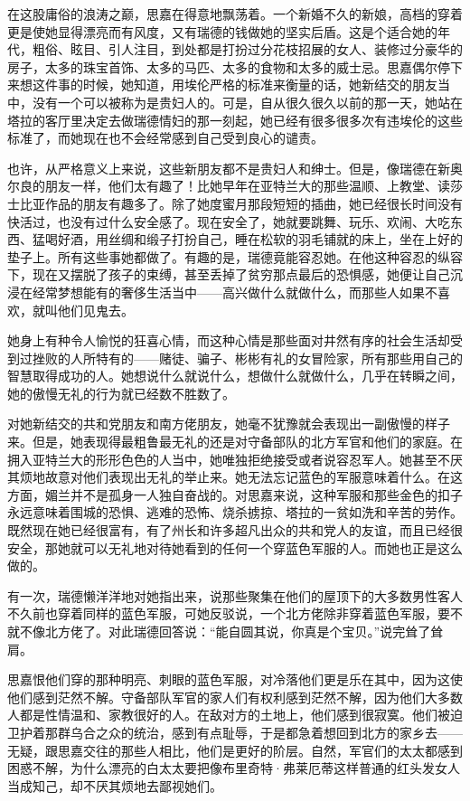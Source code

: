 \par 在这股庸俗的浪涛之巅，思嘉在得意地飘荡着。一个新婚不久的新娘，高档的穿着更是使她显得漂亮而有风度，又有瑞德的钱做她的坚实后盾。这是个适合她的年代，粗俗、眩目、引人注目，到处都是打扮过分花枝招展的女人、装修过分豪华的房子，太多的珠宝首饰、太多的马匹、太多的食物和太多的威士忌。思嘉偶尔停下来想这件事的时候，她知道，用埃伦严格的标准来衡量的话，她新结交的朋友当中，没有一个可以被称为是贵妇人的。可是，自从很久很久以前的那一天，她站在塔拉的客厅里决定去做瑞德情妇的那一刻起，她已经有很多很多次有违埃伦的这些标准了，而她现在也不会经常感到自己受到良心的谴责。
\par 也许，从严格意义上来说，这些新朋友都不是贵妇人和绅士。但是，像瑞德在新奥尔良的朋友一样，他们太有趣了！比她早年在亚特兰大的那些温顺、上教堂、读莎士比亚作品的朋友有趣多了。除了她度蜜月那段短短的插曲，她已经很长时间没有快活过，也没有过什么安全感了。现在安全了，她就要跳舞、玩乐、欢闹、大吃东西、猛喝好酒，用丝绸和缎子打扮自己，睡在松软的羽毛铺就的床上，坐在上好的垫子上。所有这些事她都做了。有趣的是，瑞德竟能容忍她。在他这种容忍的纵容下，现在又摆脱了孩子的束缚，甚至丢掉了贫穷那点最后的恐惧感，她便让自己沉浸在经常梦想能有的奢侈生活当中——高兴做什么就做什么，而那些人如果不喜欢，就叫他们见鬼去。
\par 她身上有种令人愉悦的狂喜心情，而这种心情是那些面对井然有序的社会生活却受到过挫败的人所特有的——赌徒、骗子、彬彬有礼的女冒险家，所有那些用自己的智慧取得成功的人。她想说什么就说什么，想做什么就做什么，几乎在转瞬之间，她的傲慢无礼的行为就已经数不胜数了。
\par 对她新结交的共和党朋友和南方佬朋友，她毫不犹豫就会表现出一副傲慢的样子来。但是，她表现得最粗鲁最无礼的还是对守备部队的北方军官和他们的家庭。在拥入亚特兰大的形形色色的人当中，她唯独拒绝接受或者说容忍军人。她甚至不厌其烦地故意对他们表现出无礼的举止来。她无法忘记蓝色的军服意味着什么。在这方面，媚兰并不是孤身一人独自奋战的。对思嘉来说，这种军服和那些金色的扣子永远意味着围城的恐惧、逃难的恐怖、烧杀掳掠、塔拉的一贫如洗和辛苦的劳作。既然现在她已经很富有，有了州长和许多超凡出众的共和党人的友谊，而且已经很安全，那她就可以无礼地对待她看到的任何一个穿蓝色军服的人。而她也正是这么做的。
\par 有一次，瑞德懒洋洋地对她指出来，说那些聚集在他们的屋顶下的大多数男性客人不久前也穿着同样的蓝色军服，可她反驳说，一个北方佬除非穿着蓝色军服，要不就不像北方佬了。对此瑞德回答说：“能自圆其说，你真是个宝贝。”说完耸了耸肩。
\par 思嘉恨他们穿的那种明亮、刺眼的蓝色军服，对冷落他们更是乐在其中，因为这使他们感到茫然不解。守备部队军官的家人们有权利感到茫然不解，因为他们大多数人都是性情温和、家教很好的人。在敌对方的土地上，他们感到很寂寞。他们被迫卫护着那群乌合之众的统治，感到有点耻辱，于是都急着想回到北方的家乡去——无疑，跟思嘉交往的那些人相比，他们是更好的阶层。自然，军官们的太太都感到困惑不解，为什么漂亮的白太太要把像布里奇特·弗莱厄蒂这样普通的红头发女人当成知己，却不厌其烦地去鄙视她们。
